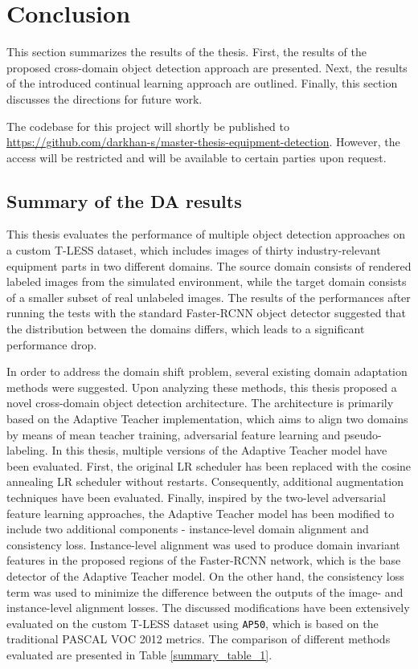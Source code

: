 
\section{Conclusion} 
This section summarizes the results of the thesis. First, the results of the proposed cross-domain object detection approach are presented. Next, the results of the introduced continual learning approach are outlined. Finally, this section discusses the directions for future work. 

The codebase for this project will shortly be published to \url{https://github.com/darkhan-s/master-thesis-equipment-detection}. However, the access will be restricted and will be available to certain parties upon request.  

\subsection{Summary of the DA results}

This thesis evaluates the performance of multiple object detection approaches on a custom T-LESS dataset, which includes images of thirty industry-relevant equipment parts in two different domains. The source domain consists of rendered labeled images from the simulated environment, while the target domain consists of a smaller subset of real unlabeled images. The results of the performances after running the tests with the  standard Faster-RCNN object detector suggested that the distribution between the domains differs, which leads to a significant performance drop. 

In order to address the domain shift problem, several existing domain adaptation methods were suggested. Upon analyzing these methods, this thesis proposed a novel cross-domain object detection architecture. The architecture is primarily based on the Adaptive Teacher implementation, which aims to align two domains by means of mean teacher training, adversarial feature learning and pseudo-labeling. In this thesis, multiple versions of the Adaptive Teacher model have been evaluated. First, the original LR scheduler has been replaced with the cosine annealing LR scheduler without restarts. Consequently, additional augmentation techniques have been evaluated. Finally, inspired by the two-level adversarial feature learning approaches, the Adaptive Teacher model has been modified to include two additional components - instance-level domain alignment and consistency loss. Instance-level alignment was used to produce domain invariant features in the proposed regions of the Faster-RCNN network, which is the base detector of the Adaptive Teacher model. On the other hand, the consistency loss term was used to minimize the difference between the outputs of the image- and instance-level alignment losses. The discussed modifications have been extensively evaluated on the custom T-LESS dataset using \texttt{AP50}, which is based on the traditional PASCAL VOC 2012 metrics. The comparison of different methods evaluated are presented in Table \ref{summary_table_1}. 

